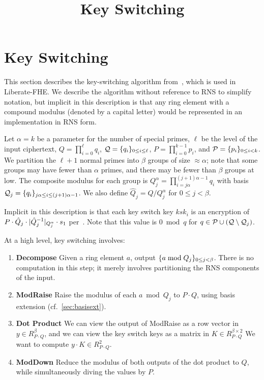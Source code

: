 \documentclass[../../fheimpl.tex]{subfiles}
\begin{document}
	\ifcompileasbook
	\else
	\title{Key Switching}
	\hypersetup{pageanchor=false}
	\maketitle
	\listoffixmes
	\tableofcontents
	\compileasbooktrue
	\hypersetup{pageanchor=true}
	\fi

\section{Key Switching}
\label{sec:ks}
This section describes the key-switching algorithm from~\cite{cryptoeprint:2019/688}, which is used in Liberate-FHE.
We describe the algorithm without reference to RNS to simplify notation, but implicit in this description is that any ring element with a compound modulus (denoted by a capital letter) would be represented in an implementation in RNS form.

Let $\alpha=k$ be a parameter for the number of special primes, $\ell$ be the level of the input ciphertext, $Q=\prod_{i=0}^{\ell}q_i$, $\mathcal{Q}=\{q_i\}_{0\le i \le \ell}$, $P=\prod_{i=0}^{k-1}p_i$, and $\mathcal{P}=\{p_i\}_{0\le i < k}$. We partition the $\ell+1$ normal primes into $\beta$ groups of size $\approx \alpha$; note that some groups may have fewer than $\alpha$ primes, and there may be fewer than $\beta$ groups at low. The composite modulus for each group is $Q_j^\alpha=\prod_{i=j\alpha}^{(j+1)\alpha-1}q_i$ with basis $\mathcal{Q}_j=\{q_i\}_{j\alpha\le i\le (j+1)\alpha-1}$. We also define $\hat{Q}_j=Q/ Q_j^\alpha$ for $0\le j<\beta$.

Implicit in this description is that each key switch key $ksk_i$ is an encryption of $P\cdot \hat{Q}_j\cdot \lvert\hat{Q}_j^{-1}\rvert_{Q_j^\alpha}\cdot s_1$ per~\cite{cryptoeprint:2020/1203}. Note that this value is $0\bmod q$ for $q\in \mathcal{P}\cup(\mathcal{Q}\setminus \mathcal{Q}_j)$.

At a high level, key switching involves:
\begin{enumerate}
	\item \textbf{Decompose} Given a ring element $a$, output $\{a\bmod Q_j\}_{0\le j< \beta}$. There is no computation in this step; it merely involves partitioning the RNS components of the input.
	\item \textbf{ModRaise} Raise the modulus of each $a\bmod Q_j$ to $P\cdot Q$, using basis extension (cf.~\cref{sec:basisext}).
	\item \textbf{Dot Product} We can view the output of \textrm{ModRaise} as a row vector in $y\in R_{P\cdot Q}^\beta$, and we can view the key switch keys as a matrix in $K\in R_{P\cdot Q}^{\beta\times 2}$ We want to compute $y\cdot K\in R^2_{P\cdot Q}$.
	\item \textbf{ModDown} Reduce the modulus of both outputs of the dot product to $Q$, while simultaneously diving the values by $P$.
\end{enumerate}
\end{document}
